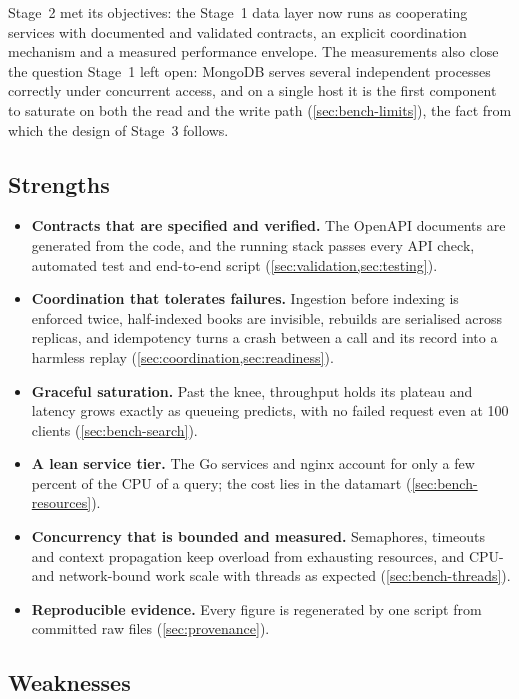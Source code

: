 \documentclass[10pt,a4paper]{article}
\begin{document}
Stage~2 met its objectives: the Stage~1 data layer now runs as cooperating
services with documented and validated contracts, an explicit coordination
mechanism and a measured performance envelope. The measurements also close the
question Stage~1 left open: MongoDB serves several independent processes
correctly under concurrent access, and on a single host it is the first
component to saturate on both the read and the write path
(\cref{sec:bench-limits}), the fact from which the design of Stage~3 follows.

\subsection{Strengths}
\label{sec:strengths}

\begin{itemize}
  \item \textbf{Contracts that are specified and verified.} The OpenAPI
  documents are generated from the code, and the running stack passes every API
  check, automated test and end-to-end script (\cref{sec:validation,sec:testing}).
  \item \textbf{Coordination that tolerates failures.} Ingestion before
  indexing is enforced twice, half-indexed books are invisible, rebuilds are
  serialised across replicas, and idempotency turns a crash between a call and
  its record into a harmless replay (\cref{sec:coordination,sec:readiness}).
  \item \textbf{Graceful saturation.} Past the knee, throughput holds its
  plateau and latency grows exactly as queueing predicts, with no failed
  request even at 100 clients (\cref{sec:bench-search}).
  \item \textbf{A lean service tier.} The Go services and nginx account for only
  a few percent of the CPU of a query; the cost lies in the datamart
  (\cref{sec:bench-resources}).
  \item \textbf{Concurrency that is bounded and measured.} Semaphores,
  timeouts and context propagation keep overload from exhausting resources,
  and CPU- and network-bound work scale with threads as expected
  (\cref{sec:bench-threads}).
  \item \textbf{Reproducible evidence.} Every figure is regenerated by one
  script from committed raw files (\cref{sec:provenance}).
\end{itemize}

\subsection{Weaknesses}
\label{sec:weaknesses}
\end{document}

